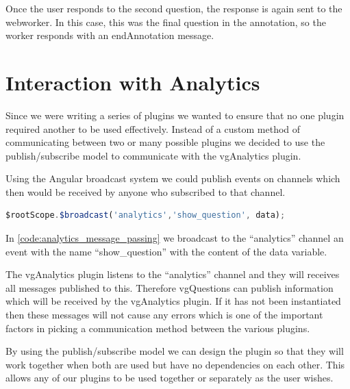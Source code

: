 Once the user responds to the second question, the response is again sent to
the \gls{webworker}. In this case, this was the final question in the annotation, so
the worker responds with an endAnnotation message.

\section{Interaction with Analytics}
\label{Section:vgQuestions Analytics}


Since we were writing a series of plugins we wanted to ensure that no one
plugin required another to be used effectively. Instead of a custom method of
communicating between two or many possible plugins we decided to use the
publish/subscribe model to communicate with the vgAnalytics plugin.

Using the Angular broadcast system we could publish events on channels which
then would be received by anyone who subscribed to that channel.

\begin{lstlisting}[language=javascript,caption={\label{code:analytics_message_passing} AngularJS demonstrating the message passing interface used in the Analytics plugin}]
$rootScope.$broadcast('analytics','show_question', data);
\end{lstlisting}

In \autoref{code:analytics_message_passing} we broadcast to the ``analytics'' channel an event with the name
``show\_question'' with the content of the data variable.

The vgAnalytics plugin listens to the ``analytics'' channel and they will
receives all messages published to this. Therefore vgQuestions can publish
information which will be received by the vgAnalytics plugin. If it has not
been instantiated then these messages will not cause any errors which is one of
the important factors in picking a communication method between the various
plugins.

By using the publish/subscribe model we can design the plugin so that they will work together when both are used but have no dependencies on each other. This allows any of our plugins to be used together or separately as the
user wishes.
